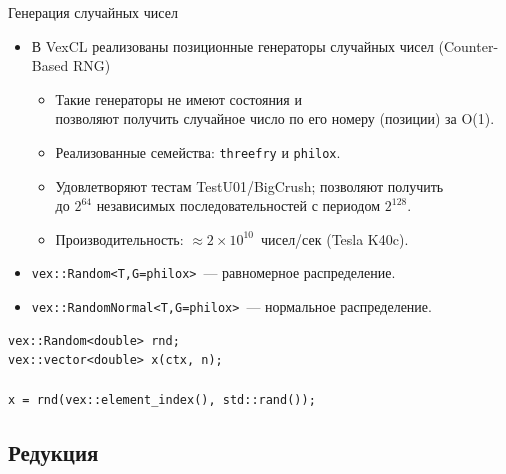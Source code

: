 \documentclass[@BEAMER_OPTIONS@]{beamer}
\newcommand{\code}[1]{\lstinline|#1|}
\begin{document}
\begin{frame}[fragile]{Генерация случайных чисел}
    \begin{itemize}
        \item В VexCL реализованы позиционные генераторы случайных чисел
            (Counter-Based RNG)
            \begin{itemize}
                \item Такие генераторы не имеют состояния и\\ позволяют
                    получить случайное число по его номеру (позиции) за O(1).
                \item Реализованные семейства: \code{threefry} и \code{philox}.
                \item Удовлетворяют тестам TestU01/BigCrush; позволяют
                    получить\\ до \alert{$2^{64}$} независимых
                    последовательностей с периодом \alert{$2^{128}$}.
                \item Производительность: \alert{$\approx
                    2\times10^{10}$}~чисел/сек (Tesla K40c).
            \end{itemize}
        \item \code{vex::Random<T,G=philox>}~--- равномерное распределение.
        \item \code{vex::RandomNormal<T,G=philox>}~--- нормальное распределение.
    \end{itemize}
    \begin{exampleblock}{}
        \begin{lstlisting}
vex::Random<double> rnd;
vex::vector<double> x(ctx, n);

x = rnd(vex::element_index(), std::rand());
        \end{lstlisting}
    \end{exampleblock}
\end{frame}


\subsection{Редукция}
\end{document}
